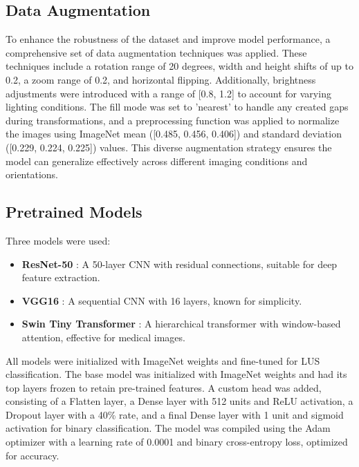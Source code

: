 \documentclass[12pt, a4paper]{article}
\begin{document}
\subsection{Data Augmentation}
To enhance the robustness of the dataset and improve model performance, a comprehensive set of data augmentation techniques was applied. These techniques include a rotation range of 20 degrees, width and height shifts of up to 0.2, a zoom range of 0.2, and horizontal flipping. Additionally, brightness adjustments were introduced with a range of [0.8, 1.2] to account for varying lighting conditions. The fill mode was set to 'nearest' to handle any created gaps during transformations, and a preprocessing function was applied to normalize the images using ImageNet mean ([0.485, 0.456, 0.406]) and standard deviation ([0.229, 0.224, 0.225]) values. This diverse augmentation strategy ensures the model can generalize effectively across different imaging conditions and orientations.

\subsection{Pretrained Models}
Three models were used:
\begin{itemize}
    \item \textbf{ResNet-50} \cite{he}: A 50-layer CNN with residual connections, suitable for deep feature extraction.
    \item \textbf{VGG16} \cite{simonyan}: A sequential CNN with 16 layers, known for simplicity.
    \item \textbf{Swin Tiny Transformer} \cite{liu}: A hierarchical transformer with window-based attention, effective for medical images.
\end{itemize}
All models were initialized with ImageNet weights and fine-tuned for LUS classification. The base model was initialized with ImageNet weights and had its top layers frozen to retain pre-trained features. A custom head was added, consisting of a Flatten layer, a Dense layer with 512 units and ReLU activation, a Dropout layer with a 40\% rate, and a final Dense layer with 1 unit and sigmoid activation for binary classification. The model was compiled using the Adam optimizer with a learning rate of 0.0001 and binary cross-entropy loss, optimized for accuracy.
\end{document}
